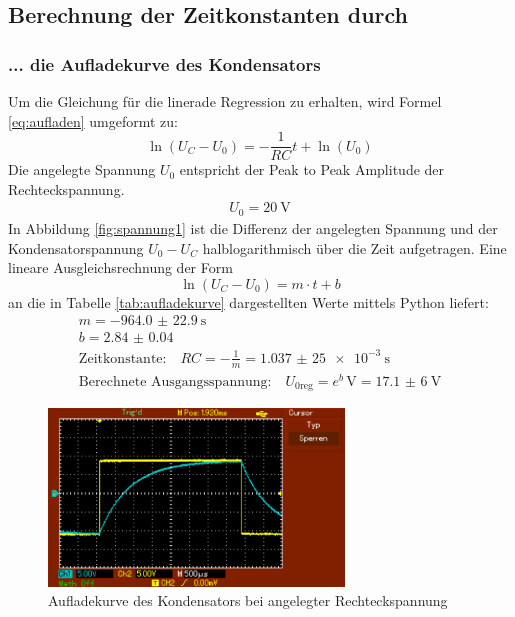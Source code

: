 


\subsection{Berechnung der Zeitkonstanten durch}
\subsubsection{... die Aufladekurve des Kondensators}
Um die Gleichung für die linerade Regression zu erhalten, wird Formel \eqref{eq:aufladen} umgeformt zu:
\begin{equation}
\ln(U_C - U_0) = -\frac{1}{RC} t + \ln(U_0)
\end{equation}
Die angelegte Spannung $U_0$ entspricht der Peak to Peak Amplitude der Rechteckspannung.
\begin{align*}
	U_0 = \SI{20}{\volt}
\end{align*}
In Abbildung \ref{fig:spannung1} ist die Differenz der angelegten Spannung und der Kondensatorspannung $U_0 - U_C$ halblogarithmisch über die Zeit aufgetragen. Eine lineare Ausgleichsrechnung der Form
\begin{equation}
\ln(U_C - U_0) = m \cdot t + b
\end{equation} an die in Tabelle \ref{tab:aufladekurve} dargestellten Werte mittels Python liefert:
\begin{align}
	m = \SI{-964.0(229)}{\second} \\
	b = \num{2.84(4)} \\
	\text{Zeitkonstante:} \quad RC = - \frac{1}{m} = \SI{1,037(25)e-3}{\second} \\
	\text{Berechnete Ausgangsspannung:} \quad U_{0\text{reg}} = e ^b \, \si{\volt} = \SI{17,1(6)}{\volt}
\end{align}
	
	
	
	
	

\begin{figure}[h!]
	\centering
	\includegraphics[width=0.7\textwidth]{aufladekurve.png}
	\caption{Aufladekurve des Kondensators bei angelegter Rechteckspannung}
	\label{fig:aufladekurve}
\end{figure} 

